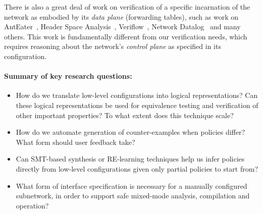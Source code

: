 There is also a great deal of work on verification of a specific incarnation of the network as embodied by its \emph{data plane} (forwarding tables), such as work on AntEater~\cite{mai+:anteater}, Header Space Analysis~\cite{hsa},
Veriflow~\cite{khurshid13veriflow}, Network Datalog~\cite{nod} and many others.  This work is fundamentally different from our
verification needs, which requires reasoning about the network's \emph{control plane} as specified in its configuration.

\paragraph*{Summary of key research questions:}

\begin{itemize}
\item How do we translate low-level configurations into logical representations?  Can these logical representations be used
for equivalence testing and verification of other important properties?  To what extent does this technique scale?

\item How do we automate generation of counter-examples when policies differ? What form should user feedback take?

\item Can SMT-based synthesis or RE-learning techniques help us infer \Name policies directly from low-level configurations given only partial \Name policies to start from?

\item What form of interface specification is necessary for a manually configured subnetwork, in order to support safe mixed-mode \Name analysis, compilation and operation?

\end{itemize}






